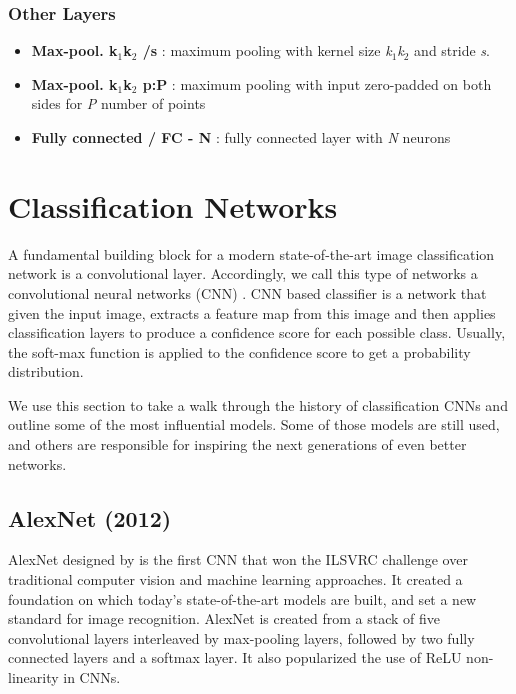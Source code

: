 \subsubsection*{Other Layers}
\begin{itemize}
    \item \textbf{Max-pool. k$_1$\x k$_2$ /s} : maximum pooling with kernel size \textit{k$_1$\x k$_2$} and stride \textit{s}.
    
    \item \textbf{Max-pool. k$_1$\x k$_2$ p:P} : maximum pooling with
 input zero-padded on both sides for \textit{P} number of points
 
    \item \textbf{Fully connected / FC - N} : fully connected layer with \textit{N} neurons
\end{itemize}

\section{Classification Networks}
\label{sec:clsnets}
A fundamental building block for a modern state-of-the-art image classification network is a convolutional layer. Accordingly, we call this type of networks a convolutional neural networks (CNN) \cite[ch.~9]{bib:dlbook}. CNN based classifier is a network that given the input image, extracts a feature map from this image and then applies classification layers to produce a confidence score for each possible class. Usually, the soft-max function is applied to the confidence score to get a probability distribution.

We use this section to take a walk through the history of classification CNNs and outline some of the most influential models. Some of those models are still used, and others are responsible for inspiring the next generations of even better networks.

\subsection{AlexNet (2012)}
AlexNet designed by \citeauthor{bib:alexnet} \cite{bib:alexnet} is the first CNN that won the ILSVRC challenge over traditional computer vision and machine learning approaches. It created a foundation on which today's state-of-the-art models are built, and set a new standard for image recognition. AlexNet is created from a stack of five convolutional layers interleaved by max-pooling layers, followed by two fully connected layers and a softmax layer. It also popularized the use of ReLU non-linearity in CNNs.

